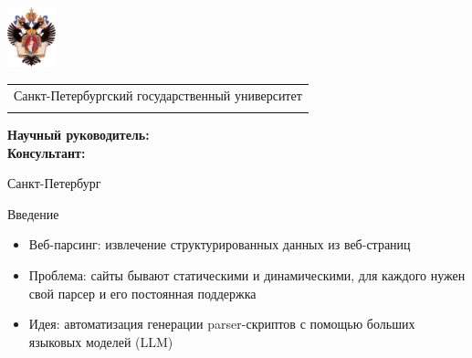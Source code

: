 \documentclass
  [ russian
  , aspectratio=1610 %
  ] {beamer}
\title[Auto parsing system]{\my@title@title@ru}
\author[\my@title@author@ru]{\my@title@author@ru, группа \academicGroup}
\institute[СПбГУ]{}
\date[8 июня 2025 г.]{}
\makeatletter
\newcommand{\advisorChair}{\my@title@chair@ru}
\newcommand{\supervisor}{\my@title@supervisor@ru}
\newcommand{\supervisorPosition}{\my@title@supervisorPosition@ru}
\newcommand{\consultant}{\my@title@consultant@ru}
\newcommand{\consultantPosition}{\my@title@consultantPosition@ru}
\newcommand{\defenseYear}{\my@title@year@ru}
\makeatother
\begin{document}
{
\begin{frame}
    \includegraphics[width=1.4cm]{figures/SPbGU_Logo.png}
    \vspace{-35pt}
    \hspace{-10pt}
    \begin{center}
        \begin{tabular}{c}
            \scriptsize{Санкт-Петербургский государственный университет} \\
            \scriptsize{\advisorChair}
        \end{tabular}
        \titlepage
    \end{center}

    \btVFill

    {\scriptsize
        \textbf{Научный руководитель:}  \supervisorPosition~\supervisor \\
        \textbf{Консультант:}  \consultantPosition~\consultant \\
    }
    \makeatother
    \begin{center}
        \vspace{5pt}
        \scriptsize{Санкт-Петербург\\ \defenseYear}
    \end{center}
\end{frame}
}


\begin{frame}{Введение}
    \begin{itemize}
        \item Веб-парсинг: извлечение структурированных данных из веб-страниц
        \item Проблема: сайты бывают статическими и динамическими, для каждого нужен свой парсер и его постоянная поддержка
        \item Идея: автоматизация генерации parser-скриптов с помощью больших языковых моделей (LLM)
    \end{itemize}
\end{frame}
\end{document}
